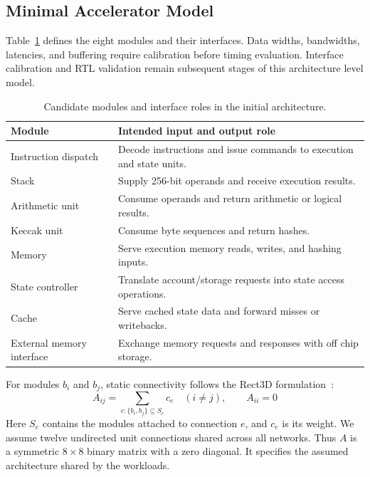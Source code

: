 \documentclass[runningheads]{llncs}
\begin{document}
\subsection{Minimal Accelerator Model}
Table~\ref{tab:modules} defines the eight modules and their interfaces. Data widths, bandwidths, latencies, and buffering require calibration before timing evaluation. Interface calibration and RTL validation remain subsequent stages of this architecture level model.
\begin{table}[H]
\caption{Candidate modules and interface roles in the initial architecture.}\label{tab:modules}
\small\centering
\begin{tabularx}{\textwidth}{@{}lX@{}}
\toprule Module & Intended input and output role \\\midrule
Instruction dispatch & Decode instructions and issue commands to execution and state units.\\
Stack & Supply 256-bit operands and receive execution results.\\
Arithmetic unit & Consume operands and return arithmetic or logical results.\\
Keccak unit & Consume byte sequences and return hashes.\\
Memory & Serve execution memory reads, writes, and hashing inputs.\\
State controller & Translate account/storage requests into state access operations.\\
Cache & Serve cached state data and forward misses or writebacks.\\
External memory interface & Exchange memory requests and responses with off chip storage.\\
\bottomrule
\end{tabularx}
\end{table}
\FloatBarrier
For modules $b_i$ and $b_j$, static connectivity follows the Rect3D formulation~\cite{rect3d}:
\begin{equation}
A_{ij}=\sum_{e:\{b_i,b_j\}\subseteq S_e}c_e \quad(i\ne j),\qquad A_{ii}=0\label{eq:connectivity}
\end{equation}
Here $S_e$ contains the modules attached to connection $e$, and $c_e$ is its weight. We assume twelve undirected unit connections shared across all networks. Thus $A$ is a symmetric $8\times8$ binary matrix with a zero diagonal. It specifies the assumed architecture shared by the workloads.
\end{document}
